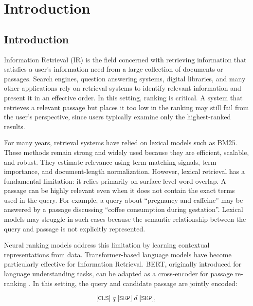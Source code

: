 \chapter{Introduction}
\label{ch:introduction}

\section{Introduction}
\label{sec:introduction}

Information Retrieval (IR) is the field concerned with retrieving information that satisfies a user's information need from a large collection of documents or passages. Search engines, question answering systems, digital libraries, and many other applications rely on retrieval systems to identify relevant information and present it in an effective order. In this setting, ranking is critical. A system that retrieves a relevant passage but places it too low in the ranking may still fail from the user's perspective, since users typically examine only the highest-ranked results.

For many years, retrieval systems have relied on lexical models such as BM25. These methods remain strong and widely used because they are efficient, scalable, and robust. They estimate relevance using term matching signals, term importance, and document-length normalization. However, lexical retrieval has a fundamental limitation: it relies primarily on surface-level word overlap. A passage can be highly relevant even when it does not contain the exact terms used in the query. For example, a query about ``pregnancy and caffeine'' may be answered by a passage discussing ``coffee consumption during gestation''. Lexical models may struggle in such cases because the semantic relationship between the query and passage is not explicitly represented.

Neural ranking models address this limitation by learning contextual representations from data. Transformer-based language models have become particularly effective for Information Retrieval. BERT, originally introduced for language understanding tasks, can be adapted as a cross-encoder for passage re-ranking \cite{devlin2018bert,nogueira2019passage}. In this setting, the query and candidate passage are jointly encoded:

\begin{equation}
    \texttt{[CLS]} \; q \; \texttt{[SEP]} \; d \; \texttt{[SEP]},
\end{equation}

